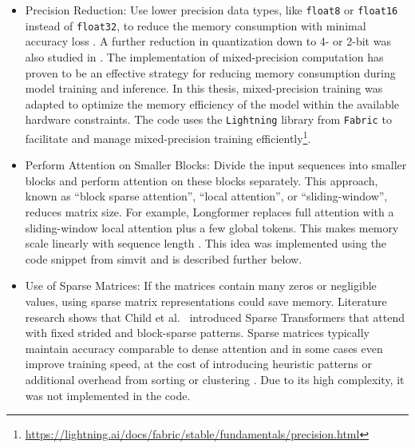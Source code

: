 \begin{itemize}
	\item Precision Reduction: Use lower precision data types, like {\tt float8} or {\tt float16} instead of {\tt float32}, to reduce the memory consumption with minimal accuracy loss \cite{Bravin_2025}. A further reduction in quantization down to 4- or 2-bit was also studied in \cite{Shen_2020}. The implementation of mixed-precision computation has proven to be an effective strategy for reducing memory consumption during model training and inference. In this thesis, mixed-precision training was adapted to optimize the memory efficiency of the model within the available hardware constraints. The code uses the {\tt Lightning} library from {\tt Fabric} to facilitate and manage mixed-precision training efficiently\footnote{\url{https://lightning.ai/docs/fabric/stable/fundamentals/precision.html}}.

	\item Perform Attention on Smaller Blocks: Divide the input sequences into smaller blocks and perform attention on these blocks separately. This approach, known as \enquote{block sparse attention}, \enquote{local attention}, or \enquote{sliding-window}, reduces matrix size. For example, Longformer replaces full attention with a sliding-window local attention plus a few global tokens. This makes memory scale linearly with sequence length \cite{beltagy2020longformerlongdocumenttransformer}. This idea was implemented using the code snippet from \acrshort{simvit} \cite{Li_2022} and is described further below.
	
	\item Use of Sparse Matrices: If the matrices contain many zeros or negligible values, using sparse matrix representations could save memory. Literature research shows that Child et al.~\cite{Child_2019} introduced Sparse Transformers that attend with fixed strided and block-sparse patterns. Sparse matrices typically maintain accuracy comparable to dense attention and in some cases even improve training speed, at the cost of introducing heuristic patterns or additional overhead from sorting or clustering \cite{Deepspeed_2020}. Due to its high complexity, it was not implemented in the code.
\end{itemize}




